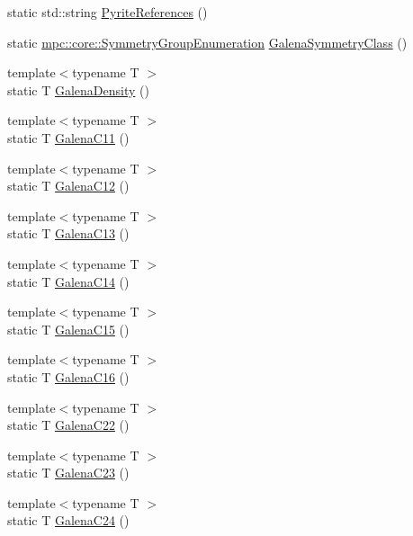 \begin{DoxyCompactItemize}
\item 
static std\+::string \mbox{\hyperlink{namespacempc_1_1data_a361dab9c71af9058ea800574b7873cc4}{Pyrite\+References}} ()
\item 
static \mbox{\hyperlink{namespacempc_1_1core_a9d979684062547055a0ef5c13077bad8}{mpc\+::core\+::\+Symmetry\+Group\+Enumeration}} \mbox{\hyperlink{namespacempc_1_1data_a523244ec5b00d796a3f7f5ecf546d6b5}{Galena\+Symmetry\+Class}} ()
\item 
{\footnotesize template$<$typename T $>$ }\\static T \mbox{\hyperlink{namespacempc_1_1data_a12025d112a84d504734103f6d9fe04bc}{Galena\+Density}} ()
\item 
{\footnotesize template$<$typename T $>$ }\\static T \mbox{\hyperlink{namespacempc_1_1data_a44aed7835ab23f082a3f86695db463a5}{Galena\+C11}} ()
\item 
{\footnotesize template$<$typename T $>$ }\\static T \mbox{\hyperlink{namespacempc_1_1data_acecfb3bc59c8ecff003dc23895a2e2e7}{Galena\+C12}} ()
\item 
{\footnotesize template$<$typename T $>$ }\\static T \mbox{\hyperlink{namespacempc_1_1data_abd5682aafcd14bdc5a5e1d3989db8322}{Galena\+C13}} ()
\item 
{\footnotesize template$<$typename T $>$ }\\static T \mbox{\hyperlink{namespacempc_1_1data_a60b4bdc4c79c3860a50d4863e470d084}{Galena\+C14}} ()
\item 
{\footnotesize template$<$typename T $>$ }\\static T \mbox{\hyperlink{namespacempc_1_1data_a40d6ba73b02fbdd4bec07b3326f6ebfd}{Galena\+C15}} ()
\item 
{\footnotesize template$<$typename T $>$ }\\static T \mbox{\hyperlink{namespacempc_1_1data_a65ccab86ef4e4af308c5c3e6a797c718}{Galena\+C16}} ()
\item 
{\footnotesize template$<$typename T $>$ }\\static T \mbox{\hyperlink{namespacempc_1_1data_ae502cc704d87cbebd836b748a193bb44}{Galena\+C22}} ()
\item 
{\footnotesize template$<$typename T $>$ }\\static T \mbox{\hyperlink{namespacempc_1_1data_a4d6d6bcd12108de041ba8d77f9bf7432}{Galena\+C23}} ()
\item 
{\footnotesize template$<$typename T $>$ }\\static T \mbox{\hyperlink{namespacempc_1_1data_a10a6d085c1acb8ffe1a512be8770a801}{Galena\+C24}} ()

\end{DoxyCompactItemize}
